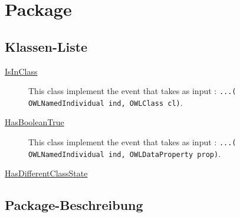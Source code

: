 
\chapter[Package ontologyFramework.OFEventManagement.OFLogicalEventManagement.OFEventImplementation]{Package }\label{ontologyFramework.OFEventManagement.OFLogicalEventManagement.OFEventImplementation-package}



\section{Klassen-Liste}
\begin{description}
\item[{\hyperlink{ontologyFramework.OFEventManagement.OFLogicalEventManagement.OFEventImplementation.IsInClass-class}{IsInClass}}]
This class implement the event that takes as input : \verb!...( OWLNamedIndividual ind, OWLClass cl)!.
\hfill\pageref{ontologyFramework.OFEventManagement.OFLogicalEventManagement.OFEventImplementation.IsInClass-class}

\item[{\hyperlink{ontologyFramework.OFEventManagement.OFLogicalEventManagement.OFEventImplementation.HasBooleanTrue-class}{HasBooleanTrue}}]
This class implement the event that takes as input : \verb!...( OWLNamedIndividual ind, OWLDataProperty prop)!.
\hfill\pageref{ontologyFramework.OFEventManagement.OFLogicalEventManagement.OFEventImplementation.HasBooleanTrue-class}

\item[{\hyperlink{ontologyFramework.OFEventManagement.OFLogicalEventManagement.OFEventImplementation.HasDifferentClassState-class}{HasDifferentClassState}}]

\hfill\pageref{ontologyFramework.OFEventManagement.OFLogicalEventManagement.OFEventImplementation.HasDifferentClassState-class}

\end{description}
\section{Package-Beschreibung}




